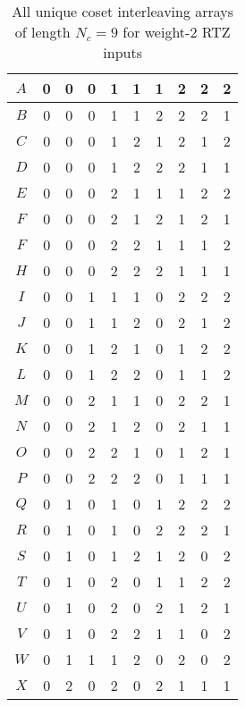 \documentclass[11pt, oneside, dvipdfmx]{book}
\begin{document}
\begin{table}[h!]
\centering
\begin{tabular}{|c || c  c  c  c  c  c  c  c  c |} 
 \hline
 $A$ & 0 & 0 & 0 & 1 & 1 & 1 & 2 & 2 & 2\\ 
  \hline
  $B$ & 0 & 0 & 0 & 1 & 1 & 2 & 2 & 2 & 1\\ 
  \hline
  $C$ & 0 & 0 & 0 & 1 & 2 & 1 & 2 & 1 & 2\\ 
  \hline
  $D$ & 0 & 0 & 0 & 1 & 2 & 2 & 2 & 1 & 1\\ 
 \hline
  $E$ & 0 & 0 & 0 & 2 & 1 & 1 & 1 & 2 & 2\\ 
 \hline
 $F$ & 0 & 0 & 0 & 2 & 1 & 2 & 1 & 2 & 1\\ 
 \hline
  $F$ & 0 & 0 & 0 & 2 & 2 & 1 & 1 & 1 & 2\\ 
 \hline
  $H$ & 0 & 0 & 0 & 2 & 2 & 2 & 1 & 1 & 1\\ 
 \hline
  $I$ & 0 & 0 & 1 & 1 & 1 & 0 & 2 & 2 & 2\\ 
 \hline
  $J$ & 0 & 0 & 1 & 1 & 2 & 0 & 2 & 1 & 2\\ 
 \hline
  $K$ & 0 & 0 & 1 & 2 & 1 & 0 & 1 & 2 & 2\\ 
 \hline
 $L$ & 0 & 0 & 1 & 2 & 2 & 0 & 1 & 1 & 2\\ 
 \hline
  $M$ & 0 & 0 & 2 & 1 & 1 & 0 & 2 & 2 & 1\\ 
 \hline
  $N$ & 0 & 0 & 2 & 1 & 2 & 0 & 2 & 1 & 1\\ 
 \hline
 $O$ & 0 & 0 & 2 & 2 & 1 & 0 & 1 & 2 & 1\\ 
 \hline
 $P$ & 0 & 0 & 2 & 2 & 2 & 0 & 1 & 1 & 1\\ 
 \hline
 $Q$ & 0 & 1 & 0 & 1 & 0 & 1 & 2 & 2 & 2\\ 
 \hline
  $R$ & 0 & 1 & 0 & 1 & 0 & 2 & 2 & 2 & 1\\ 
 \hline
 $S$ & 0 & 1 & 0 & 1 & 2 & 1 & 2 & 0 & 2\\ 
 \hline
 $T$ & 0 & 1 & 0 & 2 & 0 & 1 & 1 & 2 & 2\\ 
 \hline
 $U$ & 0 & 1 & 0 & 2 & 0 & 2 & 1 & 2 & 1\\ 
 \hline
 $V$ & 0 & 1 & 0 & 2 & 2 & 1 & 1 & 0 & 2\\ 
 \hline
 $W$ & 0 & 1 & 1 & 1 & 2 & 0 & 2 & 0 & 2\\ 
 \hline
 $X$ & 0 & 2 & 0 & 2 & 0 & 2 & 1 & 1 & 1\\ 
 \hline
\end{tabular}
\caption{All unique coset interleaving arrays of length $N_c =9$ for weight-$2$ RTZ inputs}
\label{tb1}
\end{table}
\end{document}
